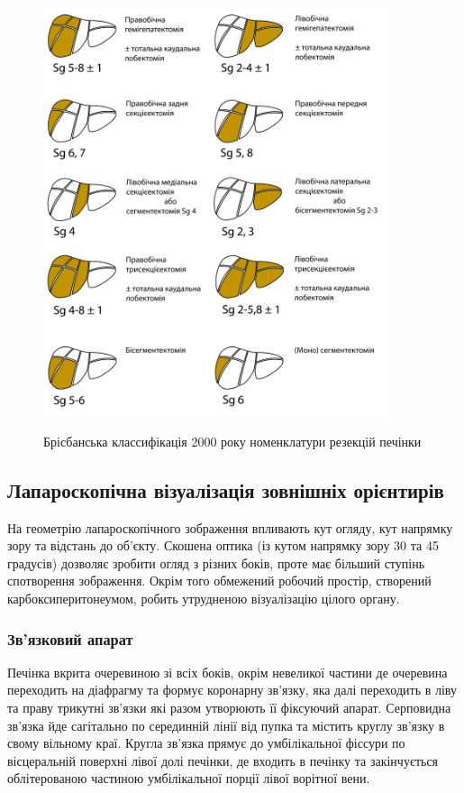 \begin{figure}[h]
\caption{Брісбанська классифікація 2000 року номенклатури резекцій печінки}
\centering
\includegraphics[width=0.9\textwidth]{Illustrations/Chapter_01/Brisbane.jpg}
\label{fig:Brisbane}
\end{figure}

\subsection{Лапароскопічна візуалізація зовнішніх орієнтирів}

На геометрію лапароскопічного зображення впливають кут огляду, кут напрямку зору та відстань до об'єкту. Скошена оптика (із кутом напрямку зору 30 та 45 градусів) дозволяє зробити огляд з різних боків, проте має більший ступінь спотворення зображення. Окрім того обмежений робочий простір, створений карбоксиперитонеумом, робить утрудненою візуалізацію цілого органу.

\subsubsection{Зв'язковий апарат}

Печінка вкрита очеревиною зі всіх боків, окрім невеликої частини  де очеревина переходить на діафрагму та формує коронарну зв'язку, яка далі переходить в ліву та праву трикутні зв'язки які разом утворюють її фіксуючий апарат. Серповидна зв'язка йде сагітально по серединній лінії від пупка та містить круглу зв'язку в свому вільному краї. Кругла зв'язка прямує до умбілікальної фіссури по вісцеральній поверхні лівої долі печінки, де входить в печінку та закінчується облітерованою частиною умбілікальної порції лівої ворітної вени. 

